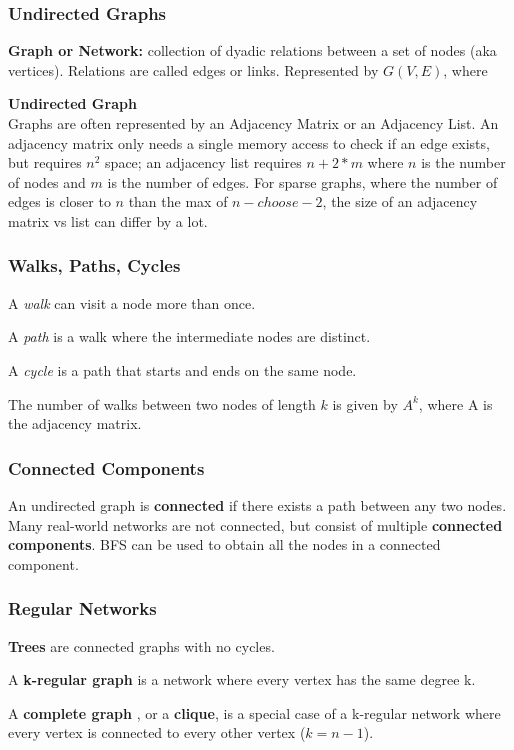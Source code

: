\documentclass[11pt]{scrartcl} %
\begin{document}
\subsubsection{Undirected Graphs}
\textbf{Graph or Network:} collection of dyadic relations between a set of nodes (aka vertices). Relations are called edges or links. Represented by $G(V,E)$, where 

\textbf{Undirected Graph} \\
Graphs are often represented by an Adjacency Matrix or an Adjacency List. An adjacency matrix only needs a single memory access to check if an edge exists, but requires $n^2$ space; an adjacency list requires $n + 2*m$ where $n$ is the number of nodes and $m$ is the number of edges. For sparse graphs, where the number of edges is closer to $n$ than the max of $n-choose-2$, the size of an adjacency matrix vs list can differ by a lot. 


\subsubsection{Walks, Paths, Cycles}
A \emph{walk} can visit a node more than once.

A \emph{path} is a walk where the intermediate nodes are distinct.

A \emph{cycle} is a path that starts and ends on the same node.

The number of walks between two nodes of length $k$ is given by $A^k$, where A is the adjacency matrix.

\subsubsection{Connected Components}
An undirected graph is \textbf{connected} if there exists a path between any two nodes. Many real-world networks are not connected, but consist of multiple \textbf{connected components}. BFS can be used to obtain all the nodes in a connected component.

\subsubsection{Regular Networks}
\textbf{Trees} are connected graphs with no cycles.

A \textbf{k-regular graph} is a network where every vertex has the same degree k.

A \textbf{complete graph} , or a \textbf{clique}, is a special case of a k-regular network where every vertex is connected to every other vertex ($k=n-1$).
\end{document}
